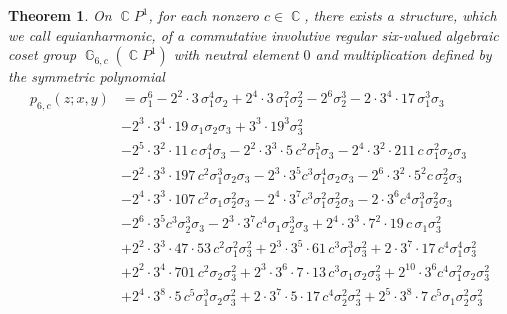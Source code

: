 \documentclass[14pt, dvipsnames]{extarticle}
\theoremstyle{plain}
\newtheorem{theorem}{Theorem}
\theoremstyle{definition}
\theoremstyle{remark}
\DeclareMathOperator{\G}{\mathbb{G}}
\DeclareMathOperator{\Cc}{\mathbb{C}}
\begin{document}
\begin{theorem}\label{6-valued_group}
On $\Cc\!P^1$, for each nonzero $c\in\Cc$, there exists a structure, which we call equianharmonic, of a commutative involutive {regular} six-valued algebraic coset group $\G_{6, c}(\Cc\!P^1)$ with neutral element $0$ and multiplication defined by the symmetric polynomial
\begin{align*}
p_{6, c}(z; x, y) &=  \sigma_{1}^{6}
- 2^{2}\cdot 3\, \sigma_{1}^{4} \sigma_{2}
+ 2^{4}\cdot 3\, \sigma_{1}^{2} \sigma_{2}^{2}
- 2^{6} \sigma_{2}^{3}
- 2\cdot 3^{4}\cdot 17\, \sigma_{1}^{3} \sigma_{3}\\
& - 2^{3}\cdot 3^{4}\cdot 19\, \sigma_{1} \sigma_{2} \sigma_{3}
+ 3^{3}\cdot 19^{3} \sigma_{3}^{2}\\
& - 2^{5}\cdot 3^{2}\cdot 11\, c\, \sigma_{1}^{4} \sigma_{3}
- 2^{2}\cdot 3^{3}\cdot 5\, c^{2} \sigma_{1}^{5} \sigma_{3} 
- 2^{4}\cdot 3^{2}\cdot 211\, c\, \sigma_{1}^{2} \sigma_{2} \sigma_{3}\\
& - 2^{2}\cdot 3^{3}\cdot 197\, c^{2} \sigma_{1}^{3} \sigma_{2} \sigma_{3}
- 2^{3}\cdot 3^{5} c^{3} \sigma_{1}^{4} \sigma_{2} \sigma_{3}
- 2^{6}\cdot 3^{2}\cdot 5^{2} c\, \sigma_{2}^{2} \sigma_{3}\\
& - 2^{4}\cdot 3^{3}\cdot 107\, c^{2} \sigma_{1} \sigma_{2}^{2} \sigma_{3}
- 2^{4}\cdot 3^{7} c^{3} \sigma_{1}^{2} \sigma_{2}^{2} \sigma_{3}
- 2\cdot 3^{6} c^{4} \sigma_{1}^{3} \sigma_{2}^{2} \sigma_{3}\\
& - 2^{6}\cdot 3^{5} c^{3} \sigma_{2}^{3} \sigma_{3}
- 2^{3}\cdot 3^{7} c^{4} \sigma_{1} \sigma_{2}^{3} \sigma_{3}
+ 2^{4}\cdot 3^{3}\cdot 7^{2}\cdot 19\, c\, \sigma_{1} \sigma_{3}^{2}\\
& + 2^{2}\cdot 3^{3}\cdot 47\cdot 53\, c^{2} \sigma_{1}^{2} \sigma_{3}^{2}
+ 2^{3}\cdot 3^{5}\cdot 61\, c^{3} \sigma_{1}^{3} \sigma_{3}^{2}
+ 2\cdot 3^{7}\cdot 17\, c^{4} \sigma_{1}^{4} \sigma_{3}^{2}\\
& + 2^{2}\cdot 3^{4}\cdot 701\, c^{2} \sigma_{2} \sigma_{3}^{2}
+ 2^{3}\cdot 3^{6}\cdot 7\cdot 13\, c^{3} \sigma_{1} \sigma_{2} \sigma_{3}^{2}
+ 2^{10}\cdot 3^{6} c^{4} \sigma_{1}^{2} \sigma_{2} \sigma_{3}^{2}\\
& + 2^{4}\cdot 3^{8}\cdot 5\, c^{5} \sigma_{1}^{3} \sigma_{2} \sigma_{3}^{2}
+ 2\cdot 3^{7}\cdot 5\cdot 17\, c^{4} \sigma_{2}^{2} \sigma_{3}^{2}
+ 2^{5}\cdot 3^{8}\cdot 7\, c^{5} \sigma_{1} \sigma_{2}^{2} \sigma_{3}^{2}\\

\end{align*}
\end{theorem}
\end{document}
